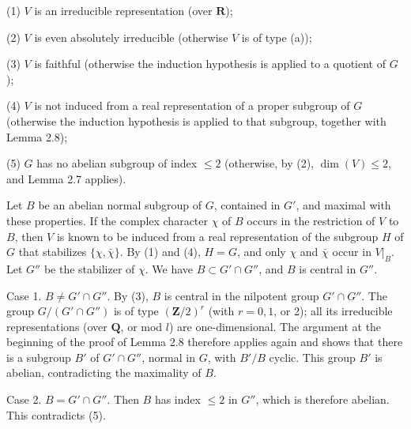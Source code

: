 \documentclass[9pt,twoside]{extarticle}
\begin{document}
{(1) \(V\) is an irreducible representation (over \(\mathbf R\));\par

(2) \(V\) is even absolutely irreducible (otherwise \(V\) is of type (a));\par

(3) \(V\) is faithful (otherwise the induction hypothesis is applied to a quotient of \(G\));\par

(4) \(V\) is not induced from a real representation of a proper subgroup of \(G\) (otherwise the induction hypothesis is applied to that subgroup, together with Lemma 2.8);\par

(5) \(G\) has no abelian subgroup of index \(\leq2\) (otherwise, by (2), \(\dim(V)\leq2\), and Lemma 2.7 applies).\par

Let \(B\) be an abelian normal subgroup of \(G\), contained in \(G'\), and maximal with these properties. If the complex character \(\chi\) of \(B\) occurs in the restriction of \(V\) to \(B\), then \(V\) is known to be induced from a real representation of the subgroup \(H\) of \(G\) that stabilizes \(\{\chi,\bar\chi\}\). By (1) and (4), \(H=G\), and only \(\chi\) and \(\bar\chi\) occur in \(V|_B\). Let \(G''\) be the stabilizer of \(\chi\). We have \(B\subset G'\cap G''\), and \(B\) is central in \(G''\).\par

Case 1. \(B\neq G'\cap G''\). By (3), \(B\) is central in the nilpotent group \(G'\cap G''\). The group \(G/(G'\cap G'')\) is of type \((\mathbf Z/2)^r\) (with \(r=0,1\), or 2); all its irreducible representations (over \(\mathbf Q\), or mod \(l\)) are one-dimensional. The argument at the beginning of the proof of Lemma 2.8 therefore applies again and shows that there is a subgroup \(B'\) of \(G'\cap G''\), normal in \(G\), with \(B'/B\) cyclic. This group \(B'\) is abelian, contradicting the maximality of \(B\).\par

Case 2. \(B=G'\cap G''\). Then \(B\) has index \(\leq2\) in \(G''\), which is therefore abelian. This contradicts (5).\par
}
\end{document}
